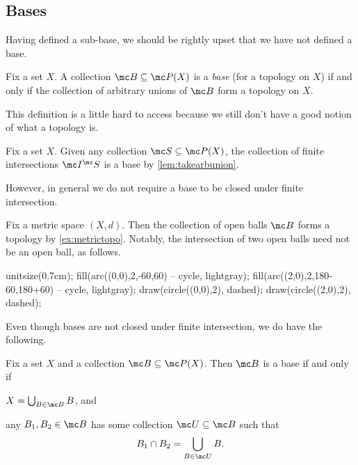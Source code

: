 \documentclass[../notes.tex]{subfiles}
\begin{document}
\subsection{Bases}
Having defined a sub-base, we should be rightly upset that we have not defined a base.
\begin{definition}[Base]
	Fix a set $X$. A collection $\mc B\subseteq\mc P(X)$ is a \textit{base} (for a topology on $X$) if and only if the collection of arbitrary unions of $\mc B$ form a topology on $X$.
\end{definition}
This definition is a little hard to access because we still don't have a good notion of what a topology is.
\begin{example}
	Fix a set $X$. Given any collection $\mc S\subseteq\mc P(X)$, the collection of finite intersections $\mc I^\mc S$ is a base by \autoref{lem:takearbunion}.
\end{example}
However, in general we do not require a base to be closed under finite intersection.
\begin{example}
	Fix a metric space $(X,d)$. Then the collection of open balls $\mc B$ forms a topology by \autoref{ex:metrictopo}. Notably, the intersection of two open balls need not be an open ball, as follows.
	\begin{center}
		\begin{asy}
			unitsize(0.7cm);
			fill(arc((0,0),2,-60,60) -- cycle, lightgray);
			fill(arc((2,0),2,180-60,180+60) -- cycle, lightgray);
			draw(circle((0,0),2), dashed);
			draw(circle((2,0),2), dashed);
		\end{asy}
	\end{center}
\end{example}
Even though bases are not closed under finite intersection, we do have the following.
\begin{prop}
	Fix a set $X$ and a collection $\mc B\subseteq\mc P(X)$. Then $\mc B$ is a base if and only if
	\begin{listalph}
		\item $X=\bigcup_{B\in\mc B}B$, and
		\item any $B_1,B_2\in\mc B$ has some collection $\mc U\subseteq\mc B$ such that
		\[B_1\cap B_2=\bigcup_{B\in\mc U}B.\]
	\end{listalph}
\end{prop}
\end{document}
